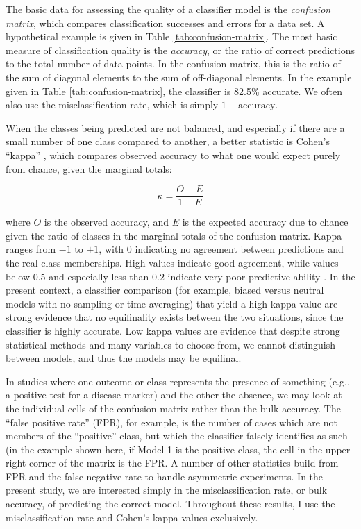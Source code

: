 The basic data for assessing the quality of a classifier model is the
\emph{confusion matrix}, which compares classification successes and
errors for a data set.  A hypothetical example is given in Table
\ref{tab:confusion-matrix}.  The most basic measure of classification quality is the \emph{accuracy}, or the ratio
of correct predictions to the total number of data points.  In the confusion matrix, this is the ratio of the sum of diagonal elements to the sum of off-diagonal elements.  In the example given in Table \ref{tab:confusion-matrix}, the classifier is 82.5\% accurate. We often also use the misclassification rate, which is simply $1 - \textrm{accuracy}$.  


When the classes
being predicted are not balanced, and especially if there are a small
number of one class compared to another, a better statistic is Cohen's
``kappa'' \cite{kuhn2013applied}, which compares observed accuracy to
what one would expect purely from chance, given the marginal totals:

\begin{equation}
\kappa = \frac{O - E}{1 - E}
\label{eq:kappa}
\end{equation}

where \(O\) is the observed accuracy, and \(E\) is the expected accuracy
due to chance given the ratio of classes in the marginal totals of the
confusion matrix. Kappa ranges from \(-1\) to \(+1\), with \(0\)
indicating no agreement between predictions and the real class
memberships. High values indicate good agreement, while values below
\(0.5\) and especially less than \(0.2\) indicate very poor predictive
ability \cite{altman1991practical}. In the present context, a
classifier comparison (for example, biased versus neutral models with no
sampling or time averaging) that yield a high kappa value are strong
evidence that no equifinality exists between the two situations, since
the classifier is highly accurate. Low kappa values are evidence that
despite strong statistical methods and many variables to choose from, we
cannot distinguish between models, and thus the models may be equifinal.  

In studies where one outcome or class represents the presence of something (e.g., a positive test for a disease marker) and the other the absence, we may look at the individual cells of the confusion matrix rather than the bulk accuracy.  The ``false positive rate'' (FPR), for example, is the number of cases which are not members of the ``positive'' class, but which the classifier falsely identifies as such (in the example shown here, if Model 1 is the positive class, the cell in the upper right corner of the matrix is the FPR.  A number of other statistics build from FPR and the false negative rate to handle asymmetric experiments.  In the present study, we are interested simply in the misclassification rate, or bulk accuracy, of predicting the correct model.  Throughout these results, I use the misclassification rate and Cohen's kappa values exclusively.  

